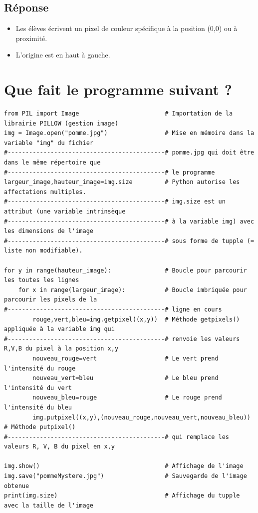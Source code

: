 \documentclass[11pt]{article}
\begin{document}
\subsection{Réponse}
\label{sec:org13e1ead}
\begin{itemize}
\item Les élèves  écrivent un pixel de couleur spécifique à la position (0,0) ou à proximité.
\item L'origine est en haut à gauche.
\end{itemize}


\section{Que fait le programme suivant ?}
\label{sec:org6ad9ae7}

\begin{verbatim}
from PIL import Image                        # Importation de la librairie PILLOW (gestion image)
img = Image.open("pomme.jpg")                # Mise en mémoire dans la variable "img" du fichier 
#--------------------------------------------# pomme.jpg qui doit être dans le même répertoire que
#--------------------------------------------# le programme
largeur_image,hauteur_image=img.size         # Python autorise les affectations multiples.
#--------------------------------------------# img.size est un attribut (une variable intrinsèque
#--------------------------------------------# à la variable img) avec les dimensions de l'image
#--------------------------------------------# sous forme de tupple (= liste non modifiable). 

for y in range(hauteur_image):               # Boucle pour parcourir les toutes les lignes
    for x in range(largeur_image):           # Boucle imbriquée pour parcourir les pixels de la
#--------------------------------------------# ligne en cours
        rouge,vert,bleu=img.getpixel((x,y))  # Méthode getpixels() appliquée à la variable img qui
#--------------------------------------------# renvoie les valeurs R,V,B du pixel à la position x,y
        nouveau_rouge=vert                   # Le vert prend l'intensité du rouge
        nouveau_vert=bleu                    # Le bleu prend l'intensité du vert
        nouveau_bleu=rouge                   # Le rouge prend l'intensité du bleu
        img.putpixel((x,y),(nouveau_rouge,nouveau_vert,nouveau_bleu)) # Méthode putpixel()
#--------------------------------------------# qui remplace les valeurs R, V, B du pixel en x,y 

img.show()                                   # Affichage de l'image
img.save("pommeMystere.jpg")                 # Sauvegarde de l'image obtenue
print(img.size)                              # Affichage du tupple avec la taille de l'image 
\end{verbatim}
\end{document}
